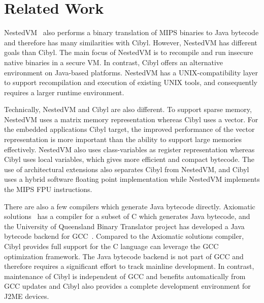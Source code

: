 \section{Related Work}
\label{sec:cibyl:related_work}
NestedVM~\cite{alliet04nestedvm} also performs a binary translation of MIPS
binaries to Java bytecode and therefore has many similarities with Cibyl.
However, NestedVM has different goals than Cibyl. The main focus of NestedVM
is to recompile and run insecure native binaries in a secure VM. In contrast,
Cibyl offers an alternative environment on Java-based platforms. NestedVM has
a UNIX-compatibility layer to support recompilation and execution of existing
UNIX tools, and consequently requires a larger runtime environment.

Technically, NestedVM and Cibyl are also different. To support sparse memory,
NestedVM uses a matrix memory representation whereas Cibyl uses a vector. For
the embedded applications Cibyl target, the improved performance of the vector
representation is more important than the ability to support large memories
effectively. NestedVM also uses class-variables as register representation
whereas Cibyl uses local variables, which gives more efficient and compact
bytecode. The use of architectural extensions also separates Cibyl from
NestedVM, and Cibyl uses a hybrid software floating point implementation while
NestedVM implements the MIPS FPU instructions.

There are also a few compilers which generate Java bytecode directly.
Axiomatic solutions~\cite{axiomsol} has a compiler for a subset of C which
generates Java bytecode, and the University of Queensland Binary Translator
project has developed a Java bytecode backend for GCC~\cite{cifuentes00UAB}.
Compared to the Axiomatic solutions compiler, Cibyl provides full support for
the C language can leverage the GCC optimization framework. The Java bytecode
backend is not part of GCC and therefore requires a significant effort to
track mainline development. In contrast, maintenance of Cibyl is independent
of GCC and benefits automatically from GCC updates and Cibyl also provides a
complete development environment for J2ME devices.

